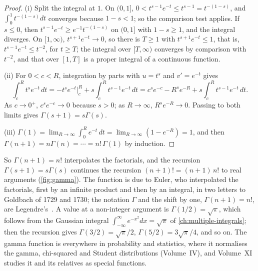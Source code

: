 \begin{proof}
(i) Split the integral at $1$. On $(0,1]$, $0<t^{s-1}e^{-t}\le t^{s-1}=t^{-(1-s)}$, and $\int_0^1t^{-(1-s)}dt$ converges because $1-s<1$; so the comparison test applies. If $s\le0$, then $t^{s-1}e^{-t}\ge e^{-1}t^{-(1-s)}$ on $(0,1]$ with $1-s\ge1$, and the integral diverges. On $[1,\infty)$, $t^{s+1}e^{-t}\to0$, so there is $T\ge1$ with $t^{s+1}e^{-t}\le1$, that is, $t^{s-1}e^{-t}\le t^{-2}$, for $t\ge T$; the integral over $[T,\infty)$ converges by comparison with $t^{-2}$, and that over $[1,T]$ is a proper integral of a continuous function.

(ii) For $0<c<R$, integration by parts with $u=t^s$ and $v'=e^{-t}$ gives
\[
\int_c^Rt^se^{-t}\,dt=-t^se^{-t}\Big|_c^R+s\int_c^Rt^{s-1}e^{-t}\,dt=c^se^{-c}-R^se^{-R}+s\int_c^Rt^{s-1}e^{-t}\,dt .
\]
As $c\to0^+$, $c^se^{-c}\to0$ because $s>0$; as $R\to\infty$, $R^se^{-R}\to0$. Passing to both limits gives $\Gamma(s+1)=s\Gamma(s)$.

(iii) $\Gamma(1)=\lim_{R\to\infty}\int_0^Re^{-t}\,dt=\lim_{R\to\infty}(1-e^{-R})=1$, and then $\Gamma(n+1)=n\Gamma(n)=\cdots=n!\,\Gamma(1)$ by induction.
\end{proof}

So $\Gamma(n+1)=n!$ interpolates the factorials, and the recursion $\Gamma(s+1)=s\Gamma(s)$ continues the recursion $(n+1)!=(n+1)\,n!$ to real arguments (\cref{fig:gamma}). The function is due to Euler, who interpolated the factorials, first by an infinite product and then by an integral, in two letters to Goldbach of 1729 and 1730; the notation $\Gamma$ and the shift by one, $\Gamma(n+1)=n!$, are Legendre's~\cite{davis1959gamma}. A value at a non-integer argument is $\Gamma(1/2)=\sqrt\pi$, which follows from the Gaussian integral $\int_{-\infty}^\infty e^{-x^2}dx=\sqrt\pi$ of \cref{ch:multiple-integrals}; then the recursion gives $\Gamma(3/2)=\sqrt\pi/2$, $\Gamma(5/2)=3\sqrt\pi/4$, and so on. The gamma function is everywhere in probability and statistics, where it normalises the gamma, chi-squared and Student distributions (Volume~IV), and Volume~XI studies it and its relatives as special functions.

